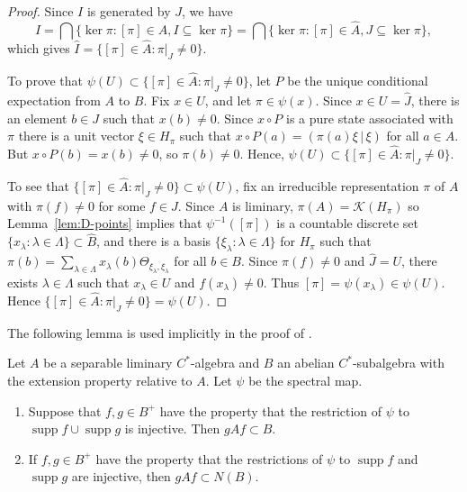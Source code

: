 \documentclass[12pt,a4paper]{amsart}
\newcommand{\Kk}{\mathcal{K}}
\newcommand{\supp}{\operatorname{supp}}
\newcommand{\Hh}{{H}}
\begin{document}
\begin{proof}
Since $I$ is generated by $J$, we have
\[
I   =\bigcap\{\ker\pi:[\pi]\in\widehat A, I\subseteq\ker\pi\}
    =\bigcap\{\ker\pi:[\pi]\in\widehat A, J\subseteq\ker\pi\},
\]
which gives $\widehat I=\{[\pi]\in\widehat A:\pi|_J\neq 0\}$.

To prove that $\psi(U) \subset \{[\pi]\in\widehat A:\pi|_J\neq
0\}$, let $P$ be the unique conditional expectation from $A$ to
$B$. Fix $x \in U$,
and let $\pi\in\psi(x)$. Since $x \in U=\widehat J$, there is
an element $b \in J$ such that $x(b) \neq 0$. Since $x\circ P$ is a pure state associated with $\pi$ there is a unit
vector $\xi\in\Hh_\pi$ such that $x\circ P(a) =
(\pi(a)\xi\,|\,\xi)$ for all $a \in A$.    But $x\circ P(b)=
x(b)\neq 0$, so $\pi(b)\neq 0$.  Hence, $\psi(U) \subset
\{[\pi]\in\widehat A:\pi|_J\neq 0\}$.

To see that $\{[\pi]\in\widehat A:\pi|_J\neq 0\}\subset
\psi(U)$, fix an irreducible representation $\pi$ of $A$ with
$\pi(f)\neq 0$ for some $f\in J$.  Since $A$ is liminary,
$\pi(A)=\Kk(H_\pi)$ so Lemma~\ref{lem:D-points} implies that
$\psi^{-1}([\pi])$ is a countable discrete set $\{x_\lambda :
\lambda\in \Lambda\} \subset \widehat{B}$, and there is a basis
$\{\xi_\lambda : \lambda \in \Lambda\}$ for $\Hh_\pi$ such that
$\pi(b)=\sum_{\lambda \in \Lambda}
x_\lambda(b)\Theta_{\xi_\lambda,\xi_\lambda}$ for all $b \in
B$. Since $\pi(f)\neq 0$ and $\widehat J=U$, there exists
$\lambda \in \Lambda$ such that $x_\lambda\in U$ and
$f(x_\lambda)\neq 0$. Thus $[\pi]=\psi(x_\lambda)\in \psi(U)$.
Hence $\{[\pi]\in\widehat A:\pi|_J\neq 0\}= \psi(U)$.
\end{proof}

The following lemma is used implicitly in the proof of
\cite[Theorem~3.1]{Kumjian1986}.

\begin{lemma}\label{lem:normaliser fairy}
Let $A$ be a separable liminary $C^*$-algebra and $B$ an
abelian $C^*$-subalgebra with the  extension property relative
to $A$. Let $\psi$ be the spectral map.
\begin{enumerate}
\item Suppose that $f,g \in B^+$ have the property that the
    restriction of $\psi$ to $\supp f\cup\supp g$ is
injective. Then $gAf \subset B$.
\item If $f,g \in B^+$ have the property that the
    restrictions of $\psi$ to $\supp f$ and $\supp g$ are
    injective, then $gAf \subset N(B)$.
\end{enumerate}
\end{lemma}
\end{document}

